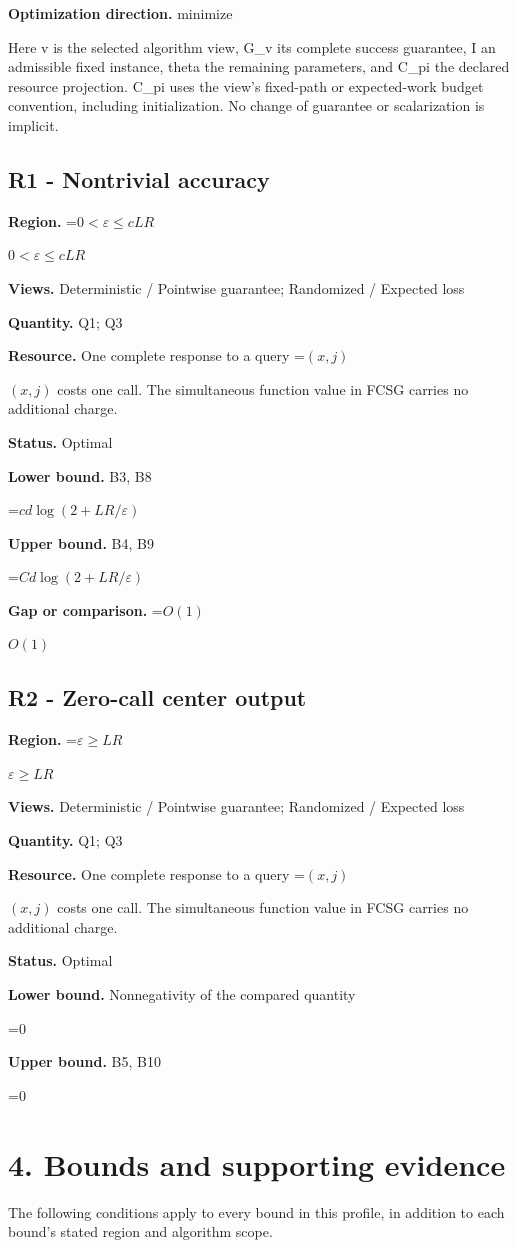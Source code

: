 \documentclass[10pt,a4paper]{article}
\newcommand{\AtlasMath}[1]{\par\begingroup\centering\setbox0=\hbox{$\displaystyle #1$}\ifdim\wd0>1.4\linewidth\typeout{ATLAS WIDE FORMULA: \the\wd0}\fi\ifdim\wd0>\linewidth\resizebox{\linewidth}{!}{\box0}\else\box0\fi\par\endgroup}
\newcommand{\AtlasInlineMath}[1]{\begingroup\setbox0=\hbox{$#1$}\ifdim\wd0>.4\linewidth\endgroup\AtlasMath{#1}\else\endgroup$#1$\fi}
\begin{document}
\textbf{Optimization direction.} minimize

Here v is the selected algorithm view, G\_v its complete success guarantee, I an admissible fixed instance, theta the remaining parameters, and C\_pi the declared resource projection. C\_pi uses the view's fixed-path or expected-work budget convention, including initialization. No change of guarantee or scalarization is implicit.

\subsection{R1 - Nontrivial accuracy}
\textbf{Region.} \AtlasInlineMath{0<\varepsilon\le cLR}

\textbf{Views.} Deterministic / Pointwise guarantee; Randomized / Expected loss

\textbf{Quantity.} Q1; Q3

\textbf{Resource.} One complete response to a query \AtlasInlineMath{(x,j)} costs one call. The simultaneous function value in FCSG carries no additional charge.

\textbf{Status.} Optimal

\textbf{Lower bound.} B3, B8

\AtlasMath{cd\log(2+LR/\varepsilon)}
\textbf{Upper bound.} B4, B9

\AtlasMath{Cd\log(2+LR/\varepsilon)}
\textbf{Gap or comparison.} \AtlasInlineMath{O(1)}

\subsection{R2 - Zero-call center output}
\textbf{Region.} \AtlasInlineMath{\varepsilon\ge LR}

\textbf{Views.} Deterministic / Pointwise guarantee; Randomized / Expected loss

\textbf{Quantity.} Q1; Q3

\textbf{Resource.} One complete response to a query \AtlasInlineMath{(x,j)} costs one call. The simultaneous function value in FCSG carries no additional charge.

\textbf{Status.} Optimal

\textbf{Lower bound.} Nonnegativity of the compared quantity

\AtlasMath{0}
\textbf{Upper bound.} B5, B10

\AtlasMath{0}
\section{4. Bounds and supporting evidence}
The following conditions apply to every bound in this profile, in addition to each bound's stated region and algorithm scope.
\end{document}
